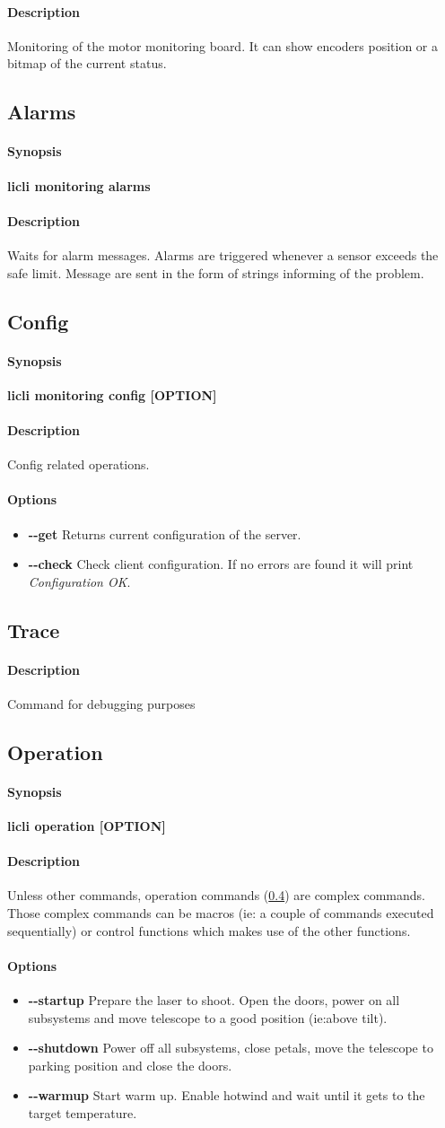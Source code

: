 \documentclass[letterpaper, 10 pt]{article}
\newcommand{\cmdsection}[1]{\paragraph{#1}\mbox{}\par}
\begin{document}
\cmdsection{Description} Monitoring of the motor monitoring board. It can show encoders position or a bitmap of the current status.

\subsection{Alarms}
\cmdsection{Synopsis} \textbf{licli monitoring alarms}\\

\cmdsection{Description} Waits for alarm messages. Alarms are triggered whenever a sensor exceeds the safe limit. Message are sent in the form of strings informing of the problem.

\subsection{Config}
\cmdsection{Synopsis} \textbf{licli monitoring config [OPTION]}\\

\cmdsection{Description} Config related operations. \\
\cmdsection{Options}
\begin{itemize}
	\item[] \textbf{-{}-get} Returns current configuration of the server.
	\item[] \textbf{-{}-check} Check client configuration. If no errors are found it will print \emph{Configuration OK}.
\end{itemize}

\subsection{Trace}
\cmdsection{Description} Command for debugging purposes

\subsection{Operation} \label{operationcmds}
\cmdsection{Synopsis} \textbf{licli operation [OPTION]}\\

\cmdsection{Description} Unless other commands, operation commands (\ref{operationcmds}) are complex commands. Those complex commands can be macros (ie: a couple of commands executed sequentially) or control functions which makes use of the other functions. \\
\cmdsection{Options}
\begin{itemize}
	\item[] \textbf{-{}-startup} Prepare the laser to shoot. Open the doors, power on all subsystems and move telescope to a good position (ie:above tilt).
	\item[] \textbf{-{}-shutdown} Power off all subsystems, close petals, move the telescope to parking position and close the doors.
	\item[] \textbf{-{}-warmup} Start warm up. Enable hotwind and wait until it gets to the target temperature.
\end{itemize}
\end{document}
